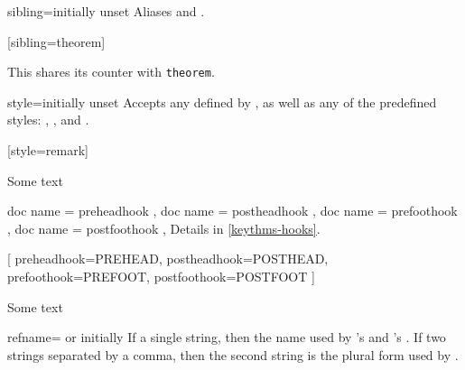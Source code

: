 \documentclass{ltxdoc}
\begin{document}
\begin{docKey}{sibling}{=}{initially unset}
Aliases  and .
\begin{tcbwritetemp}
[sibling=theorem]
\end{tcbwritetemp}
\begin{keythmscode}[withpreamble]
\begin{lemma}
This shares its counter with
\texttt{theorem}.
\end{lemma}
\end{keythmscode}
\end{docKey}

\begin{docKey}{style}{=}{initially unset}
Accepts any  defined by , as well as any of the predefined  styles: , , and .
\begin{tcbwritetemp}
[style=remark]
\end{tcbwritetemp}
\begin{keythmscode}[withpreamble]
\begin{remark}
Some text
\end{remark}
\end{keythmscode}
\end{docKey}

\begin{docKeys}[
  doc parameter = {=\meta{code}},
  doc description = initially unset,
  ]
  {
    { doc name = preheadhook },
    { doc name = postheadhook },
    { doc name = prefoothook },
    { doc name = postfoothook },
  }
Details in \autoref{keythms-hooks}.
\begin{tcbwritetemp}
[
  preheadhook=PREHEAD,
  postheadhook=POSTHEAD,
  prefoothook=PREFOOT,
  postfoothook=POSTFOOT
]
\end{tcbwritetemp}
\begin{keythmscode}[withpreamble]
\begin{test}
Some text
\end{test}
\end{keythmscode}
\end{docKeys}

\begin{docKey}{refname}{= \textrm{or} }{initially }
If a single string, then the name used by 's  and 's . If two strings separated by a comma, then the second string is the plural form used by .
\end{docKey}
\end{document}
